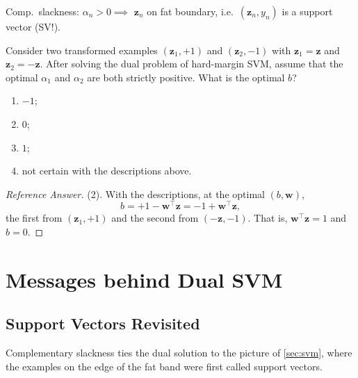 \begin{moral}
    Comp.\ slackness: \(\alpha_n > 0 \implies\) \(\bm{z}_n\) on fat
    boundary, i.e.\ \((\bm{z}_n, y_n)\) is a support vector (SV!).
\end{moral}

\begin{exercise}
    Consider two transformed examples \((\bm{z}_1, +1)\) and \((\bm{z}_2,
    -1)\) with \(\bm{z}_1 = \bm{z}\) and \(\bm{z}_2 = -\bm{z}\). After solving
    the dual problem of hard-margin SVM, assume that the optimal
    \(\alpha_1\) and \(\alpha_2\) are both strictly positive. What is the
    optimal \(b\)?
    \begin{enumerate}[(1)]
        \item \(-1\);
        \item \(0\);
        \item \(1\);
        \item not certain with the descriptions above.
    \end{enumerate}
\end{exercise}

\begin{proof}[Reference Answer]
    (2). With the descriptions, at the optimal \((b, \bm{w})\),
    \[
        b = +1 - \bm{w}^\top \bm{z} = -1 + \bm{w}^\top \bm{z},
    \]
    the first from \((\bm{z}_1, +1)\) and the second from \((-\bm{z},
    -1)\). That is, \(\bm{w}^\top \bm{z} = 1\) and \(b = 0\).
\end{proof}

\section{Messages behind Dual SVM}\label{sec:dual-messages}


\subsection{Support Vectors Revisited}

Complementary slackness ties the dual solution to the picture of
\autoref{sec:svm}, where the examples on the edge of the fat band were first
called support vectors.

